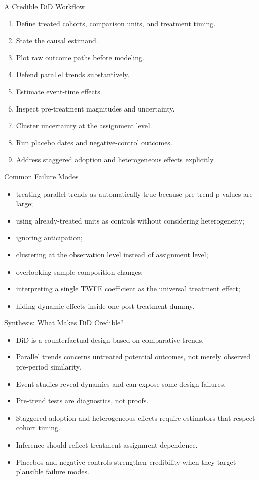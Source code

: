 \documentclass[aspectratio=169,11pt]{beamer}
\begin{document}
\begin{frame}{A Credible DiD Workflow}
\begin{enumerate}
\item Define treated cohorts, comparison units, and treatment timing.
\item State the causal estimand.
\item Plot raw outcome paths before modeling.
\item Defend parallel trends substantively.
\item Estimate event-time effects.
\item Inspect pre-treatment magnitudes and uncertainty.
\item Cluster uncertainty at the assignment level.
\item Run placebo dates and negative-control outcomes.
\item Address staggered adoption and heterogeneous effects explicitly.
\end{enumerate}
\end{frame}

\begin{frame}{Common Failure Modes}
\begin{itemize}
\item treating parallel trends as automatically true because pre-trend p-values are large;
\item using already-treated units as controls without considering heterogeneity;
\item ignoring anticipation;
\item clustering at the observation level instead of assignment level;
\item overlooking sample-composition changes;
\item interpreting a single TWFE coefficient as the universal treatment effect;
\item hiding dynamic effects inside one post-treatment dummy.
\end{itemize}
\end{frame}

\begin{frame}{Synthesis: What Makes DiD Credible?}
\begin{itemize}
\item DiD is a counterfactual design based on comparative trends.
\item Parallel trends concerns untreated potential outcomes, not merely observed pre-period similarity.
\item Event studies reveal dynamics and can expose some design failures.
\item Pre-trend tests are diagnostics, not proofs.
\item Staggered adoption and heterogeneous effects require estimators that respect cohort timing.
\item Inference should reflect treatment-assignment dependence.
\item Placebos and negative controls strengthen credibility when they target plausible failure modes.
\end{itemize}
\end{frame}
\end{document}
